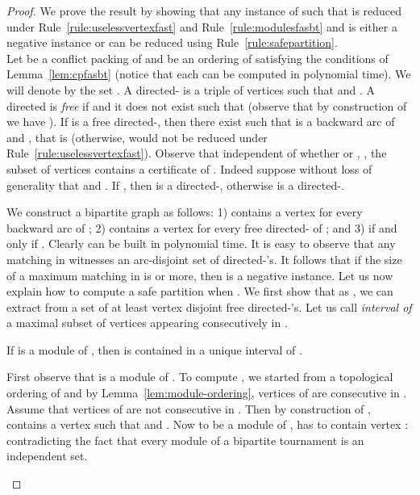 \begin{proof}

We prove the result by showing that any instance  of \FASBT{} such that  is reduced under Rule~\ref{rule:uselessvertexfast} and Rule~\ref{rule:modulesfasbt} and  is either a negative instance or can be reduced using Rule~\ref{rule:safepartition}. \\ 

Let  be a conflict packing of  and  be an ordering of  satisfying the conditions of Lemma~\ref{lem:cpfasbt} (notice that each can be computed in polynomial time). 
We will denote by  the set . A directed- is a triple of vertices  such that  and . A directed  is \emph{free} if  and it does not exist  such that  (observe that by construction of  we have ). If  is a free directed-, then there exist  such that  is a backward arc of  and , that is  (otherwise,  would not be reduced under Rule~\ref{rule:uselessvertexfast}). Observe that independent of whether  or , , the subset of vertices  contains a certificate of . Indeed suppose without loss of generality that  and .  If , then  is a directed-, otherwise  is a directed-.

We construct a bipartite graph  as follows: 1)  contains a vertex  for every backward arc  of ; 2)  contains a vertex  for every free directed- of ; and 3)  if and only if . Clearly  can be built in polynomial time. It is easy to observe that any matching in  witnesses an arc-disjoint set of directed-'s. It follows that if the size  of a maximum matching in  is  or more, then  is a negative instance. Let us now explain how to compute a safe partition when . We first show that as , we can extract from  a set  of at least  vertex disjoint free directed-'s. Let us call \emph{interval of } a maximal subset 
of vertices appearing consecutively in . 

\begin{claim} \label{cl:module-interval}
If  is a module of , then  is contained in a unique interval of .
\end{claim}
\begin{proofclaim}
First observe that  is a module of . To compute , we started from a topological ordering  of  and by Lemma~\ref{lem:module-ordering}, vertices of  are consecutive in .
Assume that vertices of  are not consecutive in . Then by construction of ,  contains a vertex  such that  and . Now to be a module of ,  has to contain vertex : contradicting the fact that every module of a bipartite tournament is an independent set.
\end{proofclaim}


\end{proof}
